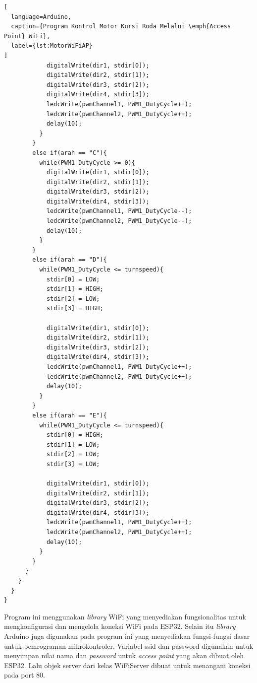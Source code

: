 \begin{lstlisting}[
  language=Arduino,
  caption={Program Kontrol Motor Kursi Roda Melalui \emph{Access Point} WiFi},
  label={lst:MotorWiFiAP}
]
            digitalWrite(dir1, stdir[0]);
            digitalWrite(dir2, stdir[1]);
            digitalWrite(dir3, stdir[2]);
            digitalWrite(dir4, stdir[3]);
            ledcWrite(pwmChannel1, PWM1_DutyCycle++);
            ledcWrite(pwmChannel2, PWM1_DutyCycle++);
            delay(10);
          }
        }
        else if(arah == "C"){
          while(PWM1_DutyCycle >= 0){
            digitalWrite(dir1, stdir[0]);
            digitalWrite(dir2, stdir[1]);
            digitalWrite(dir3, stdir[2]);
            digitalWrite(dir4, stdir[3]);
            ledcWrite(pwmChannel1, PWM1_DutyCycle--);
            ledcWrite(pwmChannel2, PWM1_DutyCycle--);
            delay(10);
          }
        }
        else if(arah == "D"){
          while(PWM1_DutyCycle <= turnspeed){
            stdir[0] = LOW;
            stdir[1] = HIGH;
            stdir[2] = LOW;
            stdir[3] = HIGH;

            digitalWrite(dir1, stdir[0]);
            digitalWrite(dir2, stdir[1]);
            digitalWrite(dir3, stdir[2]);
            digitalWrite(dir4, stdir[3]);
            ledcWrite(pwmChannel1, PWM1_DutyCycle++);
            ledcWrite(pwmChannel2, PWM1_DutyCycle++);
            delay(10);
          }
        }
        else if(arah == "E"){
          while(PWM1_DutyCycle <= turnspeed){
            stdir[0] = HIGH;
            stdir[1] = LOW;
            stdir[2] = LOW;
            stdir[3] = LOW;

            digitalWrite(dir1, stdir[0]);
            digitalWrite(dir2, stdir[1]);
            digitalWrite(dir3, stdir[2]);
            digitalWrite(dir4, stdir[3]);
            ledcWrite(pwmChannel1, PWM1_DutyCycle++);
            ledcWrite(pwmChannel2, PWM1_DutyCycle++);
            delay(10);
          }
        }
      }
    }
  }
}  
\end{lstlisting}

Program ini menggunakan \emph{library} WiFi yang menyediakan fungsionalitas untuk mengkonfigurasi dan mengelola koneksi WiFi pada ESP32. Selain itu \emph{library} Arduino juga digunakan pada program ini yang menyediakan fungsi-fungsi dasar untuk pemrograman mikrokontroler. Variabel ssid dan password digunakan untuk menyimpan nilai nama dan \emph{password} untuk \emph{access point} yang akan dibuat oleh ESP32. Lalu objek server dari kelas WiFiServer dibuat untuk menangani koneksi pada port 80.

